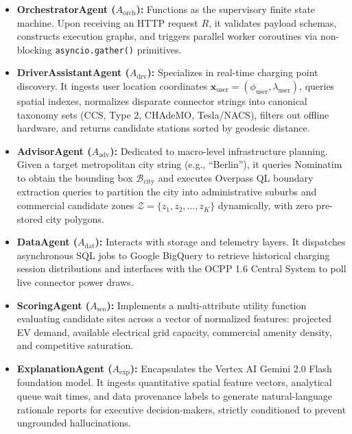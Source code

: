 \documentclass[preprint,12pt,authoryear]{elsarticle}
\begin{document}
\begin{itemize}
    \item \textbf{OrchestratorAgent ($A_{\text{orch}}$):} Functions as the supervisory finite state machine. Upon receiving an HTTP request $R$, it validates payload schemas, constructs execution graphs, and triggers parallel worker coroutines via non-blocking \texttt{asyncio.gather()} primitives.
    
    \item \textbf{DriverAssistantAgent ($A_{\text{drv}}$):} Specializes in real-time charging point discovery. It ingests user location coordinates $\mathbf{x}_{\text{user}} = (\phi_{\text{user}}, \lambda_{\text{user}})$, queries spatial indexes, normalizes disparate connector strings into canonical taxonomy sets (CCS, Type 2, CHAdeMO, Tesla/NACS), filters out offline hardware, and returns candidate stations sorted by geodesic distance.
    
    \item \textbf{AdvisorAgent ($A_{\text{adv}}$):} Dedicated to macro-level infrastructure planning. Given a target metropolitan city string (e.g., ``Berlin''), it queries Nominatim to obtain the bounding box $\mathcal{B}_{\text{city}}$ and executes Overpass QL boundary extraction queries to partition the city into administrative suburbs and commercial candidate zones $\mathcal{Z} = \{z_1, z_2, \dots, z_K\}$ dynamically, with zero pre-stored city polygons.
    
    \item \textbf{DataAgent ($A_{\text{dat}}$):} Interacts with storage and telemetry layers. It dispatches asynchronous SQL jobs to Google BigQuery to retrieve historical charging session distributions and interfaces with the OCPP 1.6 Central System to poll live connector power draws.
    
    \item \textbf{ScoringAgent ($A_{\text{sco}}$):} Implements a multi-attribute utility function evaluating candidate sites across a vector of normalized features: projected EV demand, available electrical grid capacity, commercial amenity density, and competitive saturation.
    
    \item \textbf{ExplanationAgent ($A_{\text{exp}}$):} Encapsulates the Vertex AI Gemini 2.0 Flash foundation model. It ingests quantitative spatial feature vectors, analytical queue wait times, and data provenance labels to generate natural-language rationale reports for executive decision-makers, strictly conditioned to prevent ungrounded hallucinations.
\end{itemize}
\end{document}
